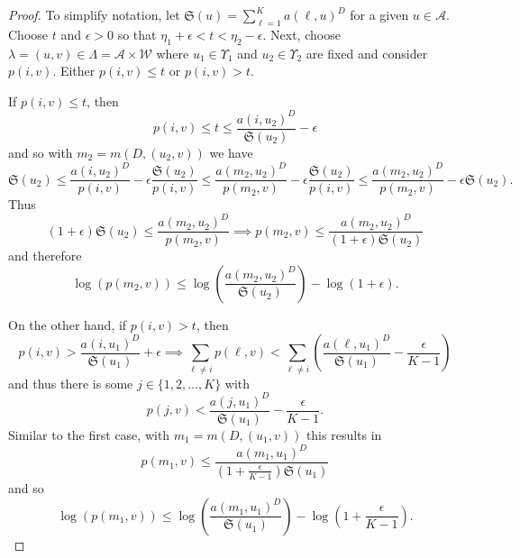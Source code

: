 \documentclass{amsart}
\theoremstyle{plain}
\numberwithin{equation}{section}
\newcommand{\cA}{{\mathcal A}}
\newcommand{\cW}{{\mathcal W}}
\newcommand{\mfS}{\mathfrak{S}}
\begin{document}
\begin{proof}
To simplify notation, let $\mfS(u)=\sum_{\ell=1}^Ka(\ell ,u)^{D}$ for a given $u \in \cA$. 
Choose $t$ and $\epsilon > 0$ so that $\eta_1 + \epsilon < t < \eta_2 - \epsilon$.
Next, choose $\lambda =(u,v)\in \Lambda = \cA \times \cW$ where $u_{1}\in \Upsilon_{1}$ and $u_{2}\in \Upsilon_{2}$ are fixed and consider $p(i,v)$. 
Either $p(i,v)\leq t$ or $p(i,v)>t$. 

If $p(i,v)\leq t$, then 
\begin{equation*}
     p(i,v)\leq t\leq \frac{a(i,u_{2})^{D}}{\mfS(u_{2})}-\epsilon 
\end{equation*}
and so with $m_{2}=m(D,(u_{2},v))$ we have 
\begin{equation*}
       \mfS(u_{2})\leq 
         \frac{a(i,u_{2})^{D}}{p(i,v)}-\epsilon \frac{\mfS(u_{2})}{p(i,v)}
      \leq \frac{a(m_{2},u_{2})^{D}}{p(m_{2},v)}-
        \epsilon \frac{\mfS(u_{2})}{p(i,v)}
                \leq \frac{a(m_{2},u_{2})^{D}}{p(m_{2}, v)}-\epsilon \mfS(u_{2}).
\end{equation*}
Thus 
\begin{equation*}
    (1+\epsilon)\mfS(u_{2})\leq \frac{a(m_{2},u_{2})^{D}}{p(m_{2},v)}\implies p(m_{2},v)
      \leq \frac{a(m_{2},u_{2})^{D}}{(1+\epsilon)\mfS(u_{2})}
\end{equation*}
and therefore 
\begin{equation}
     \log (p(m_2,v))\leq \log \left( \dfrac{a(m_2,u_2)^{D}}{\mfS(u_2)}\right) -\log (1+\epsilon).
\label{eq:gap_inequality2}
\end{equation}

On the other hand, if $p(i,v)>t$, then
\[
    p(i,v) > \frac{a(i,u_1)^D}{\mfS(u_1)} + \epsilon \implies \sum_{\ell \ne i} p(\ell,v) < \sum_{\ell \ne i}\left(\dfrac{a(\ell,u_1)^D}{\mfS(u_1)} - \frac{\epsilon}{K-1} \right)
\]
and thus there is some $j \in \{1,2,\ldots ,K\}$ with 
\begin{equation*}
    p(j,v)<\frac{a(j,u_{1})^{D}}{\mfS(u_{1})}-\frac{\epsilon}{K-1}.
\end{equation*}
Similar to the first case, with $m_1 = m(D,(u_1,v))$ this results in 
\begin{equation*}
      p(m_1,v)\leq \frac{a(m_1,u_{1})^{D}}{(1+\frac{\epsilon}{K-1})\mfS(u_{1})}
\end{equation*}
and so 
\begin{equation}
        \log (p(m_1,v))   \leq 
         \log \left( \dfrac{a(m_1,u_1)^D}{\mfS(u_1)}\right) -\log (1+\frac{\epsilon}{K-1}).  
   \label{eq:gap_inequality1}
\end{equation}


\end{proof}
\end{document}
